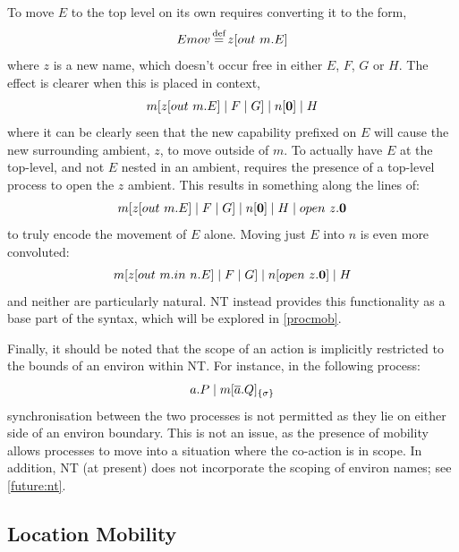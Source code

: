 To move $E$ to the top level on its own requires converting it to the
form,
\begin{equation}
Emov \operatorname{\stackrel{\textrm{def}}{=}} z[out\ m.E]
\end{equation}
where $z$ is a new name, which doesn't occur free in either
$E$, $F$, $G$ or $H$.  The effect is clearer when this is placed in
context,
\begin{equation}
m[z[out\ m.E]\;|\;F\;|\;G]\;|\;n[\textbf{0}]\;|\;H
\end{equation}
where it can be clearly seen that the new capability prefixed
on $E$ will cause the new surrounding ambient, $z$, to move outside of
$m$.  To actually have $E$ at the top-level, and not $E$ nested in an
ambient, requires the presence of a top-level process to open the $z$
ambient.  This results in something along the lines of:
\begin{equation}
m[z[out\ m.E]\;|\;F\;|\;G]\;|\;n[\textbf{0}]\;|\;H\;|\;open\ z.\textbf{0}
\end{equation}
to truly encode the movement of $E$ alone.  Moving just $E$
into $n$ is even more convoluted:
\begin{equation}
m[z[out\ m.in\ n.E]\;|\;F\;|\;G]\;|\;n[open\ z.\textbf{0}]\;|\;H
\end{equation}
and neither are particularly natural.  NT instead provides
this functionality as a base part of the syntax, which will be explored
in \ref{procmob}.  

Finally, it should be noted that the scope of an action is implicitly
restricted to the bounds of an environ within NT.  For instance, in the
following process:
\begin{equation}
a.P \;|\; {m}[ \overline{a}.Q ]_{\{\sigma\}}
\end{equation}
synchronisation between the two processes is not permitted as
they lie on either side of an environ boundary.  This is not an issue,
as the presence of mobility allows processes to move into a situation
where the co-action is in scope.  In addition, NT (at present) does not
incorporate the scoping of environ names; see \ref{future:nt}.

\subsection{Location Mobility}
\label{locmob}

